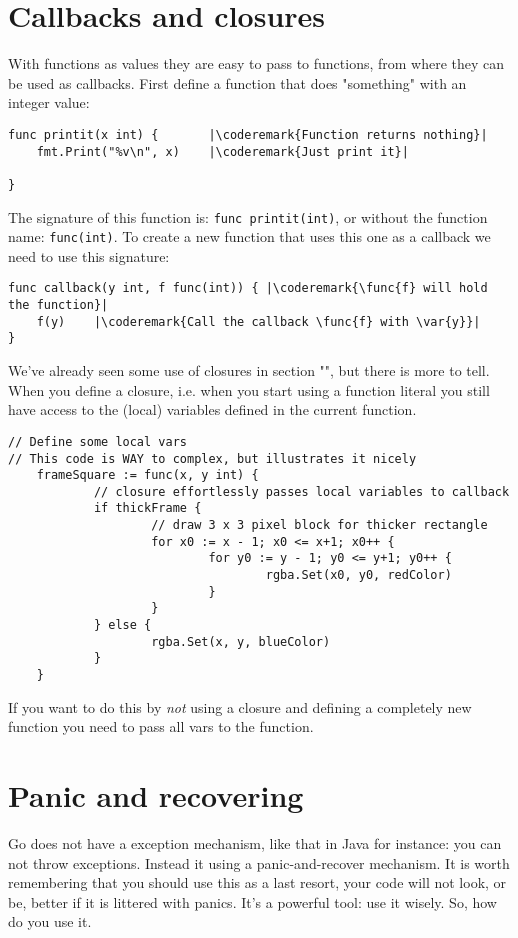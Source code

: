 \section{Callbacks and closures}
\label{sec:callbacks}
With functions as values they are easy to pass to functions, from where
they can be used as callbacks. First define a function that
does "something" with an integer value:
\begin{lstlisting}
func printit(x int) {       |\coderemark{Function returns nothing}|
    fmt.Print("%v\n", x)    |\coderemark{Just print it}|

}
\end{lstlisting}
The signature of this function is: \lstinline{func printit(int)}, or
without the function name: \mbox{\lstinline{func(int)}}. To create a new function
that uses this one as a callback we need to use this signature:
\begin{lstlisting}
func callback(y int, f func(int)) { |\coderemark{\func{f} will hold the function}|
    f(y)    |\coderemark{Call the callback \func{f} with \var{y}}|
}
\end{lstlisting}
We've already seen some use of closures in section "", but there
is more to tell. When you define a closure, i.e. when you start using a function
literal you still have access to the (local) variables defined in the current
function.

\begin{lstlisting}
// Define some local vars
// This code is WAY to complex, but illustrates it nicely
    frameSquare := func(x, y int) {
            // closure effortlessly passes local variables to callback
            if thickFrame {
                    // draw 3 x 3 pixel block for thicker rectangle
                    for x0 := x - 1; x0 <= x+1; x0++ {
                            for y0 := y - 1; y0 <= y+1; y0++ {
                                    rgba.Set(x0, y0, redColor)
                            }
                    }
            } else {
                    rgba.Set(x, y, blueColor)
            }
    }
\end{lstlisting}

If you want to do this by \emph{not} using a closure and defining a completely new
function you need to pass all vars to the function.



\section{Panic and recovering}
\label{sec:panic}
Go does not have a exception mechanism, like that in Java for instance: you can not throw exceptions.
Instead it using a panic-and-recover mechanism. It is worth remembering that you should use this as
a last resort, your code will not look, or be, better if it is littered with panics. It's a powerful tool:
use it wisely. So, how do you use it.


